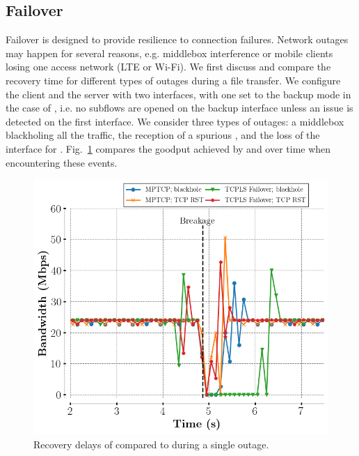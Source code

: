 \subsection{Failover}
\label{sec:eval_failover}

Failover is designed to provide resilience to \tcpls connection
failures. Network outages may happen
for several reasons, e.g. middlebox interference or mobile clients losing
one access network (LTE or Wi-Fi). 
We first discuss and compare the recovery time
for different types of outages during a file transfer. We configure the client 
and the server with two interfaces, with one set to the 
backup mode in the case of \mptcp, i.e. no subflows are opened on the backup 
interface unless an issue is detected on the first interface. 
We consider three 
types of outages: a middlebox blackholing all the traffic, the reception of a 
spurious \rst, and the loss of the interface for \mptcp.
Fig.~\ref{fig:recovery}
compares the goodput achieved by \mptcp and \tcpls over time when encountering 
these events.

\begin{figure}[!t]
  \begin{center}
    \includegraphics[width=.8\columnwidth]{figures/breakage_analysis.png}
  \end{center}
\vspace{-0.5cm}
  \caption{Recovery delays of \tcpls compared to \mptcp during a single outage.}
  \label{fig:recovery}
\end{figure}

